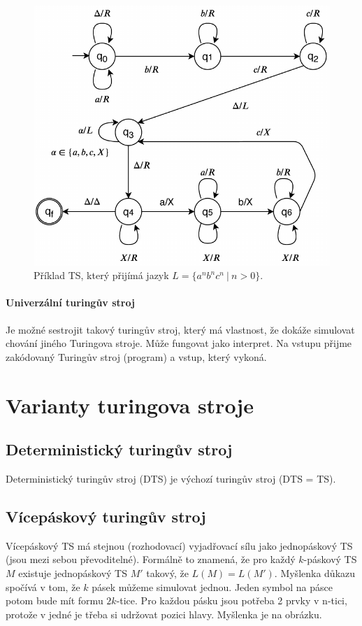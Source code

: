 \begin{figure}[H]
    \centering
    \includegraphics[width=0.8\linewidth]{ts_example.pdf}
    \caption{Příklad TS, který přijímá jazyk $L = \{ a^n b^n c^n ~|~ n > 0 \}$.}
\end{figure}

\paragraph*{Univerzální turingův stroj} Je možné sestrojit takový turingův stroj, který má vlastnost, že dokáže simulovat chování jiného Turingova stroje. Může fungovat jako interpret. Na vstupu přijme zakódovaný Turingův stroj (program) a vstup, který vykoná.


\section{Varianty turingova stroje}

\subsection{Deterministický turingův stroj} Deterministický turingův stroj (DTS) je výchozí turingův stroj (DTS = TS).

\subsection{Vícepáskový turingův stroj}

Vícepáskový TS má stejnou (rozhodovací) vyjadřovací sílu jako jednopáskový TS (jsou mezi sebou převoditelné). Formálně to znamená, že pro každý $k$-páskový TS $M$ existuje jednopáskový TS $M'$ takový, že $L(M) = L(M')$. Myšlenka důkazu spočívá v tom, že $k$ pásek můžeme simulovat jednou. Jeden symbol na pásce potom bude mít formu $2k$-tice. Pro každou pásku jsou potřeba 2 prvky v n-tici, protože v jedné je třeba si udržovat pozici hlavy. Myšlenka je na obrázku.

